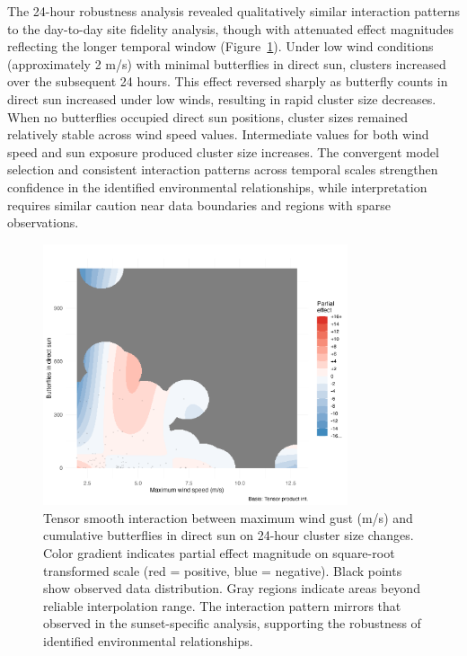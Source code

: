The 24-hour robustness analysis revealed qualitatively similar interaction patterns to the day-to-day site fidelity analysis, though with attenuated effect magnitudes reflecting the longer temporal window (Figure~\ref{fig:interaction_wind_sun_24hr}). Under low wind conditions (approximately 2 m/s) with minimal butterflies in direct sun, clusters increased over the subsequent 24 hours. This effect reversed sharply as butterfly counts in direct sun increased under low winds, resulting in rapid cluster size decreases. When no butterflies occupied direct sun positions, cluster sizes remained relatively stable across wind speed values. Intermediate values for both wind speed and sun exposure produced cluster size increases. The convergent model selection and consistent interaction patterns across temporal scales strengthen confidence in the identified environmental relationships, while interpretation requires similar caution near data boundaries and regions with sparse observations.

\begin{figure}[htbp]
    \centering
    \includegraphics[width=0.8\textwidth]{supplemental/results/24hr/figures/interaction_wind_x_sun_binned.png}
    \caption{Tensor smooth interaction between maximum wind gust (m/s) and cumulative butterflies in direct sun on 24-hour cluster size changes. Color gradient indicates partial effect magnitude on square-root transformed scale (red = positive, blue = negative). Black points show observed data distribution. Gray regions indicate areas beyond reliable interpolation range. The interaction pattern mirrors that observed in the sunset-specific analysis, supporting the robustness of identified environmental relationships.}
    \label{fig:interaction_wind_sun_24hr}
\end{figure}